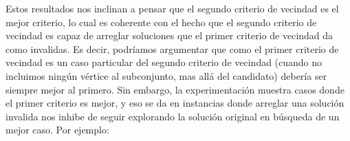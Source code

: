 \begin{center}

\end{center}

Estos resultados nos inclinan a pensar que el segundo criterio de vecindad es el mejor criterio, lo cual es coherente con el hecho que el segundo criterio de vecindad es capaz de arreglar soluciones que el primer criterio de vecindad da como invalidas. Es decir, podríamos argumentar que como el primer criterio de vecindad es un caso particular del segundo criterio de vecindad (cuando no incluimos ningún vértice al subconjunto, mas allá del candidato) debería ser siempre mejor al primero. Sin embargo, la experimentación muestra casos donde el primer criterio es mejor, y eso se da en instancias donde arreglar una solución invalida nos inhibe de seguir explorando la solución original en búsqueda de un mejor caso. Por ejemplo:

